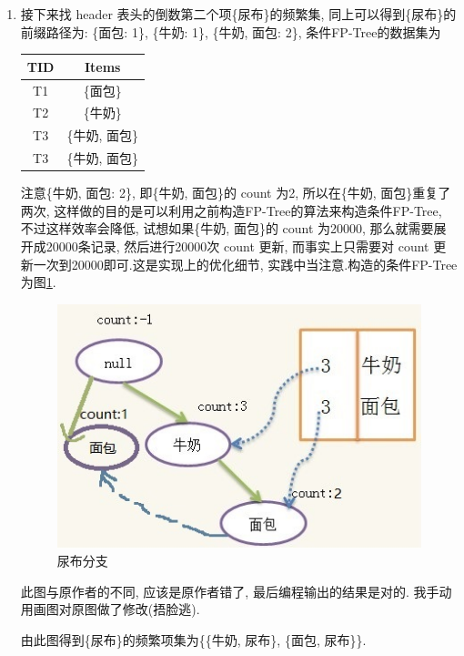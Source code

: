 \documentclass[a4paper,UTF8]{ctexart}
\theoremstyle{plain} \newtheorem{theorem}{定理}[section]
\theoremstyle{plain} \newtheorem{definition}{定义}[section]
\theoremstyle{plain} \newtheorem{lemma}{引理}[section]
\theoremstyle{plain} \newtheorem{proposition}{命题}[section]
\theoremstyle{plain} \newtheorem{example}{例}[section]
\theoremstyle{plain} \newtheorem{remark}{注}[section]
\theoremstyle{plain} \newtheorem{corollary}{推论}[section]
\begin{document}
\begin{enumerate}[(1)]
\item 接下来找 header 表头的倒数第二个项\{尿布\}的频繁集, 同上可以得到\{尿布\}的前缀路径为: \{面包: 1\}, \{牛奶: 1\}, \{牛奶, 面包: 2\}, 条件FP-Tree的数据集为
\begin{table}[!htb]
\centering
\label{fp2}
\begin{tabular}{c|c}
	\hline
    \textbf{TID} & \textbf{Items}  \\
    \hline
    T1   &  \{面包\}  \\
    \hline
    T2   &  \{牛奶\} \\
    \hline
    T3   &  \{牛奶, 面包\}  \\
    \hline
    T3   &  \{牛奶, 面包\}  \\
	\hline
\end{tabular}
\end{table}

注意\{牛奶, 面包: 2\}, 即\{牛奶, 面包\}的 count 为2, 所以在\{牛奶, 面包\}重复了两次, 这样做的目的是可以利用之前构造FP-Tree的算法来构造条件FP-Tree, 不过这样效率会降低, 试想如果\{牛奶, 面包\}的 count 为20000, 那么就需要展开成20000条记录, 然后进行20000次 count 更新, 而事实上只需要对 count 更新一次到20000即可.这是实现上的优化细节, 实践中当注意.构造的条件FP-Tree为图\ref{ar2}.
\begin{figure}[!htb]
	\centering
	\includegraphics[width = 0.80 \textwidth]{ar2.jpg}
	\caption{尿布分支}
	\label{ar2}
\end{figure}

此图与原作者的不同, 应该是原作者错了, 最后编程输出的结果是对的. 我手动用画图对原图做了修改(捂脸逃).

由此图得到\{尿布\}的频繁项集为\{\{牛奶, 尿布\}, \{面包, 尿布\}\}.

\end{enumerate}
\end{document}
